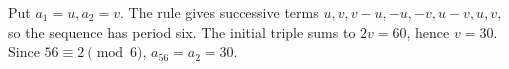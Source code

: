 Put $a_1=u,a_2=v$. The rule gives successive terms $u,v,v-u,-u,-v,u-v,u,v$, so the sequence has period six. The initial triple sums to $2v=60$, hence $v=30$. Since $56\equiv2\pmod6$, $a_{56}=a_2=\boxed{30}$.
